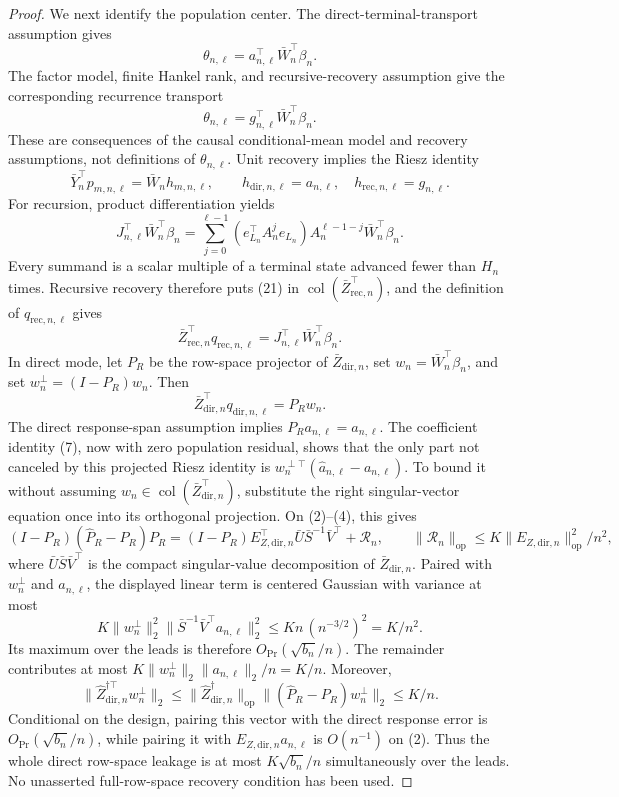 \documentclass{article}
\begin{document}
\begin{proof}
We next identify the population center.  The direct-terminal-transport assumption gives
\[
 \theta_{n,\ell}=a_{n,\ell}^\top\bar W_n^\top\beta_n.
 \tag{18}
\]
The factor model, finite Hankel rank, and recursive-recovery assumption give the corresponding recurrence transport
\[
 \theta_{n,\ell}=g_{n,\ell}^\top\bar W_n^\top\beta_n.
 \tag{19}
\]
These are consequences of the causal conditional-mean model and recovery assumptions, not definitions of \(\theta_{n,\ell}\).  Unit recovery implies the Riesz identity
\[
 \bar Y_n^\top p_{m,n,\ell}=\bar W_nh_{m,n,\ell},\qquad
 h_{\mathrm{dir},n,\ell}=a_{n,\ell},\quad
 h_{\mathrm{rec},n,\ell}=g_{n,\ell}.
 \tag{20}
\]
For recursion, product differentiation yields
\[
 J_{n,\ell}^\top\bar W_n^\top\beta_n
 =\sum_{j=0}^{\ell-1}
 (e_{L_n}^\top A_n^je_{L_n})
 A_n^{\ell-1-j}\bar W_n^\top\beta_n.
 \tag{21}
\]
Every summand is a scalar multiple of a terminal state advanced fewer than \(H_n\) times.  Recursive recovery therefore puts (21) in \(\operatorname{col}(\bar Z_{\mathrm{rec},n}^\top)\), and the definition of \(q_{\mathrm{rec},n,\ell}\) gives
\[
 \bar Z_{\mathrm{rec},n}^\top q_{\mathrm{rec},n,\ell}
 =J_{n,\ell}^\top\bar W_n^\top\beta_n.
 \tag{22}
\]
In direct mode, let \(P_R\) be the row-space projector of
\(\bar Z_{\mathrm{dir},n}\), set \(w_n=\bar W_n^\top\beta_n\), and set
\(w_n^\perp=(I-P_R)w_n\).  Then
\[
 \bar Z_{\mathrm{dir},n}^\top q_{\mathrm{dir},n,\ell}=P_Rw_n.
\]
The direct response-span assumption implies \(P_Ra_{n,\ell}=a_{n,\ell}\).
The coefficient identity (7), now with zero population residual, shows that
the only part not canceled by this projected Riesz identity is
\(w_n^{\perp\top}(\widehat a_{n,\ell}-a_{n,\ell})\).  To bound it without
assuming \(w_n\in\operatorname{col}(\bar Z_{\mathrm{dir},n}^\top)\),
substitute the right singular-vector equation once into its orthogonal
projection.  On (2)--(4), this gives
\[
 (I-P_R)(\widehat P_R-P_R)P_R
 =(I-P_R)E_{Z,\mathrm{dir},n}^\top
   \bar U\bar S^{-1}\bar V^\top+\mathcal R_n,\qquad
 \|\mathcal R_n\|_{\mathrm{op}}
 \le K\|E_{Z,\mathrm{dir},n}\|_{\mathrm{op}}^2/n^2,
\]
where \(\bar U\bar S\bar V^\top\) is the compact singular-value
decomposition of \(\bar Z_{\mathrm{dir},n}\).  Paired with
\(w_n^\perp\) and \(a_{n,\ell}\), the displayed linear term is centered
Gaussian with variance at most
\[
 K\|w_n^\perp\|_2^2\|\bar S^{-1}\bar V^\top a_{n,\ell}\|_2^2
 \le Kn\,(n^{-3/2})^2=K/n^2.
\]
Its maximum over the leads is therefore \(O_{\Pr}(\sqrt{b_n}/n)\).
The remainder contributes at most
\(K\|w_n^\perp\|_2\|a_{n,\ell}\|_2/n=K/n\).  Moreover,
\[
 \|\widehat Z_{\mathrm{dir},n}^{\dagger\top}w_n^\perp\|_2
 \le\|\widehat Z_{\mathrm{dir},n}^\dagger\|_{\mathrm{op}}
    \|(\widehat P_R-P_R)w_n^\perp\|_2\le K/n.
\]
Conditional on the design, pairing this vector with the direct response
error is \(O_{\Pr}(\sqrt{b_n}/n)\), while pairing it with
\(E_{Z,\mathrm{dir},n}a_{n,\ell}\) is \(O(n^{-1})\) on (2).
Thus the whole direct row-space leakage is at most
\(K\sqrt{b_n}/n\) simultaneously over the leads.  No unasserted
full-row-space recovery condition has been used.


\end{proof}
\end{document}
